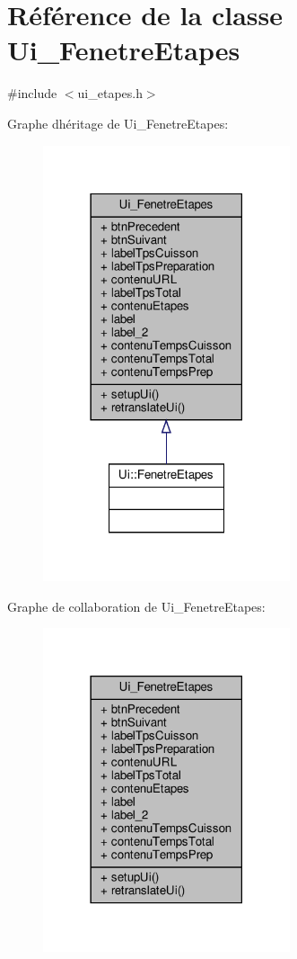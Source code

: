 \hypertarget{class_ui___fenetre_etapes}{}\section{Référence de la classe Ui\+\_\+\+Fenetre\+Etapes}
\label{class_ui___fenetre_etapes}


{\ttfamily \#include $<$ui\+\_\+etapes.\+h$>$}



Graphe d\textquotesingle{}héritage de Ui\+\_\+\+Fenetre\+Etapes\+:
\nopagebreak
\begin{figure}[H]
\begin{center}
\leavevmode
\includegraphics[width=206pt]{class_ui___fenetre_etapes__inherit__graph}
\end{center}
\end{figure}


Graphe de collaboration de Ui\+\_\+\+Fenetre\+Etapes\+:
\nopagebreak
\begin{figure}[H]
\begin{center}
\leavevmode
\includegraphics[width=206pt]{class_ui___fenetre_etapes__coll__graph}
\end{center}
\end{figure}
